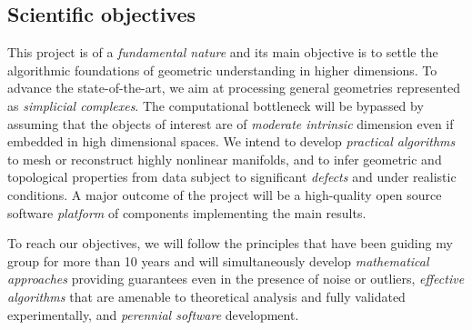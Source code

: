 \subsection{Scientific objectives} 
This project is of a {\em fundamental nature} and its main objective is to settle the algorithmic foundations of geometric understanding in higher dimensions. To advance the state-of-the-art, we aim at processing general geometries represented as {\em simplicial complexes}. The computational bottleneck will be bypassed by assuming that the objects of interest are of {\em moderate intrinsic} dimension even if embedded in high dimensional spaces. We intend to develop {\em practical algorithms} to mesh or reconstruct highly nonlinear manifolds, and to infer geometric and topological properties from data subject to significant {\em defects} and
 under realistic conditions. A major outcome of the project will be a high-quality open source software {\em platform} of components implementing the main results.






To reach our objectives, we will follow the principles that have been guiding my group for more than 10 years and will simultaneously develop
{\em mathematical approaches} providing guarantees even in the presence of noise or outliers,
{\em effective algorithms} that are amenable to theoretical analysis and fully validated experimentally,
and {\em perennial software} development.


